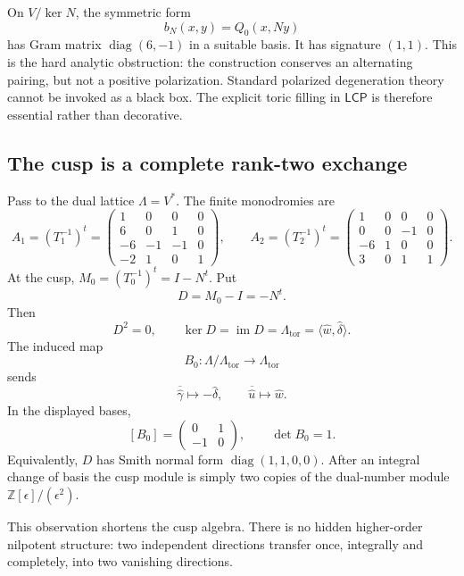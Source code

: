 \documentclass[11pt,reqno]{amsart}
\numberwithin{equation}{section}
\newcommand{\Z}{\mathbb Z}
\newcommand{\im}{\operatorname{im}}
\newcommand{\wideg}{\widehat\gamma}
\newcommand{\wideu}{\widehat u}
\newcommand{\widew}{\widehat w}
\newcommand{\wided}{\widehat\delta}
\newcommand{\LambdaTor}{\Lambda_{\mathrm{tor}}}
\newcommand{\LCP}{\mathsf{LCP}}
\theoremstyle{definition}
\begin{document}
On $V/\ker N$, the symmetric form
\[
 b_N(x,y)=Q_0(x,Ny)
\]
has Gram matrix $\operatorname{diag}(6,-1)$ in a suitable basis. It has signature $(1,1)$. This is the hard analytic obstruction: the construction conserves an alternating pairing, but not a positive polarization. Standard polarized degeneration theory cannot be invoked as a black box. The explicit toric filling in $\LCP$ is therefore essential rather than decorative.

\subsection{The cusp is a complete rank-two exchange}

Pass to the dual lattice $\Lambda=V^*$. The finite monodromies are
\begin{equation}\label{eq:A1A2}
A_1=(T_1^{-1})^t=
\begin{pmatrix}
1&0&0&0\\
6&0&1&0\\
-6&-1&-1&0\\
-2&1&0&1
\end{pmatrix},
\qquad
A_2=(T_2^{-1})^t=
\begin{pmatrix}
1&0&0&0\\
0&0&-1&0\\
-6&1&0&0\\
3&0&1&1
\end{pmatrix}.
\end{equation}
At the cusp, $M_0=(T_0^{-1})^t=I-N^t$. Put
\[
D=M_0-I=-N^t.
\]
Then
\[
D^2=0,
\qquad
\ker D=\im D=\LambdaTor=\langle\widew,\wided\rangle.
\]
The induced map
\[
B_0:\Lambda/\LambdaTor\longrightarrow\LambdaTor
\]
sends
\[
\overline{\wideg}\longmapsto-\wided,
\qquad
\overline{\wideu}\longmapsto\widew.
\]
In the displayed bases,
\begin{equation}\label{eq:B0}
[B_0]=
\begin{pmatrix}
0&1\\
-1&0
\end{pmatrix},
\qquad
\det B_0=1.
\end{equation}
Equivalently, $D$ has Smith normal form $\operatorname{diag}(1,1,0,0)$. After an integral change of basis the cusp module is simply two copies of the dual-number module $\Z[\epsilon]/(\epsilon^2)$.

This observation shortens the cusp algebra. There is no hidden higher-order nilpotent structure: two independent directions transfer once, integrally and completely, into two vanishing directions.
\end{document}
